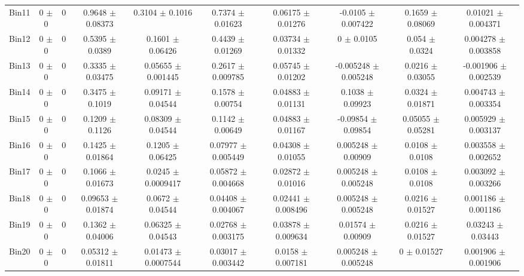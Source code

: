 \begin{tabular}{@{\extracolsep{4pt}}lccccccccc@{}}
     Bin11 & 0 $\pm$ 0 & 0 & 0.9648 $\pm$ 0.08373 & 0.3104 $\pm$ 0.1016 & 0.7374 $\pm$ 0.01623 & 0.06175 $\pm$ 0.01276 & -0.0105 $\pm$ 0.007422 & 0.1659 $\pm$ 0.08069 & 0.01021 $\pm$ 0.004371 \\ 
     Bin12 & 0 $\pm$ 0 & 0 & 0.5395 $\pm$ 0.0389 & 0.1601 $\pm$ 0.06426 & 0.4439 $\pm$ 0.01269 & 0.03734 $\pm$ 0.01332 & 0 $\pm$ 0.0105 & 0.054 $\pm$ 0.0324 & 0.004278 $\pm$ 0.003858 \\ 
     Bin13 & 0 $\pm$ 0 & 0 & 0.3335 $\pm$ 0.03475 & 0.05655 $\pm$ 0.001445 & 0.2617 $\pm$ 0.009785 & 0.05745 $\pm$ 0.01202 & -0.005248 $\pm$ 0.005248 & 0.0216 $\pm$ 0.03055 & -0.001906 $\pm$ 0.002539 \\ 
     Bin14 & 0 $\pm$ 0 & 0 & 0.3475 $\pm$ 0.1019 & 0.09171 $\pm$ 0.04544 & 0.1578 $\pm$ 0.00754 & 0.04883 $\pm$ 0.01131 & 0.1038 $\pm$ 0.09923 & 0.0324 $\pm$ 0.01871 & 0.004743 $\pm$ 0.003354 \\ 
     Bin15 & 0 $\pm$ 0 & 0 & 0.1209 $\pm$ 0.1126 & 0.08309 $\pm$ 0.04544 & 0.1142 $\pm$ 0.00649 & 0.04883 $\pm$ 0.01167 & -0.09854 $\pm$ 0.09854 & 0.05055 $\pm$ 0.05281 & 0.005929 $\pm$ 0.003137 \\ 
     Bin16 & 0 $\pm$ 0 & 0 & 0.1425 $\pm$ 0.01864 & 0.1205 $\pm$ 0.06425 & 0.07977 $\pm$ 0.005449 & 0.04308 $\pm$ 0.01055 & 0.005248 $\pm$ 0.00909 & 0.0108 $\pm$ 0.0108 & 0.003558 $\pm$ 0.002652 \\ 
     Bin17 & 0 $\pm$ 0 & 0 & 0.1066 $\pm$ 0.01673 & 0.0245 $\pm$ 0.0009417 & 0.05872 $\pm$ 0.004668 & 0.02872 $\pm$ 0.01016 & 0.005248 $\pm$ 0.005248 & 0.0108 $\pm$ 0.0108 & 0.003092 $\pm$ 0.003266 \\ 
     Bin18 & 0 $\pm$ 0 & 0 & 0.09653 $\pm$ 0.01874 & 0.0672 $\pm$ 0.04544 & 0.04408 $\pm$ 0.004067 & 0.02441 $\pm$ 0.008496 & 0.005248 $\pm$ 0.005248 & 0.0216 $\pm$ 0.01527 & 0.001186 $\pm$ 0.001186 \\ 
     Bin19 & 0 $\pm$ 0 & 0 & 0.1362 $\pm$ 0.04006 & 0.06325 $\pm$ 0.04543 & 0.02768 $\pm$ 0.003175 & 0.03878 $\pm$ 0.009634 & 0.01574 $\pm$ 0.00909 & 0.0216 $\pm$ 0.01527 & 0.03243 $\pm$ 0.03443 \\ 
     Bin20 & 0 $\pm$ 0 & 0 & 0.05312 $\pm$ 0.01811 & 0.01473 $\pm$ 0.0007544 & 0.03017 $\pm$ 0.003442 & 0.0158 $\pm$ 0.007181 & 0.005248 $\pm$ 0.005248 & 0 $\pm$ 0.01527 & 0.001906 $\pm$ 0.001906 \\ 
\hline\hline
  \end{tabular}
